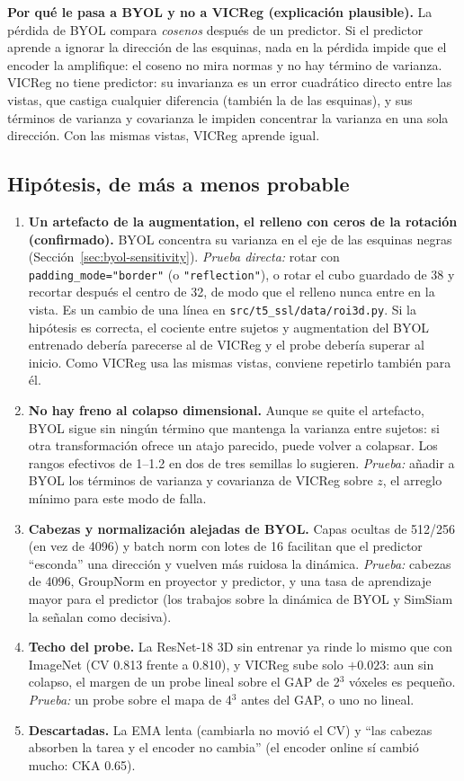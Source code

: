 \documentclass[11pt,a4paper]{article}
\begin{document}
\textbf{Por qué le pasa a BYOL y no a VICReg (explicación plausible).} La pérdida de BYOL
compara \emph{cosenos} después de un predictor. Si el predictor aprende a ignorar la dirección
de las esquinas, nada en la pérdida impide que el encoder la amplifique: el coseno no mira
normas y no hay término de varianza. VICReg no tiene predictor: su invarianza es un error
cuadrático directo entre las vistas, que castiga cualquier diferencia (también la de las
esquinas), y sus términos de varianza y covarianza le impiden concentrar la varianza en una
sola dirección. Con las mismas vistas, VICReg aprende igual.

\subsection{Hipótesis, de más a menos probable}

\begin{enumerate}[leftmargin=16pt]
\item \textbf{Un artefacto de la augmentation, el relleno con ceros de la rotación
  (confirmado).} BYOL concentra su varianza en el eje de las esquinas negras
  (Sección~\ref{sec:byol-sensitivity}). \emph{Prueba directa:} rotar con
  \texttt{padding\_mode="border"} (o \texttt{"reflection"}), o rotar el cubo guardado de 38 y
  recortar después el centro de 32, de modo que el relleno nunca entre en la vista. Es un
  cambio de una línea en \texttt{src/t5\_ssl/data/roi3d.py}. Si la hipótesis es correcta, el
  cociente entre sujetos y augmentation del BYOL entrenado debería parecerse al de VICReg y el
  probe debería superar al inicio. Como VICReg usa las mismas vistas, conviene repetirlo
  también para él.
\item \textbf{No hay freno al colapso dimensional.} Aunque se quite el artefacto, BYOL sigue
  sin ningún término que mantenga la varianza entre sujetos: si otra transformación ofrece un
  atajo parecido, puede volver a colapsar. Los rangos efectivos de 1--1.2 en dos de tres
  semillas lo sugieren. \emph{Prueba:} añadir a BYOL los términos de varianza y covarianza de
  VICReg sobre $z$, el arreglo mínimo para este modo de falla.
\item \textbf{Cabezas y normalización alejadas de BYOL.} Capas ocultas de 512/256 (en vez de
  4096) y batch norm con lotes de 16 facilitan que el predictor ``esconda'' una dirección y
  vuelven más ruidosa la dinámica. \emph{Prueba:} cabezas de 4096, GroupNorm en proyector y
  predictor, y una tasa de aprendizaje mayor para el predictor (los trabajos sobre la
  dinámica de BYOL y SimSiam la señalan como decisiva).
\item \textbf{Techo del probe.} La ResNet-18 3D sin entrenar ya rinde lo mismo que con
  ImageNet (CV 0.813 frente a 0.810), y VICReg sube solo $+0.023$: aun sin colapso, el margen
  de un probe lineal sobre el GAP de 2$^3$ vóxeles es pequeño. \emph{Prueba:} un probe sobre el
  mapa de 4$^3$ antes del GAP, o uno no lineal.
\item \textbf{Descartadas.} La EMA lenta (cambiarla no movió el CV) y ``las cabezas absorben
  la tarea y el encoder no cambia'' (el encoder online sí cambió mucho: CKA 0.65).
\end{enumerate}
\end{document}
